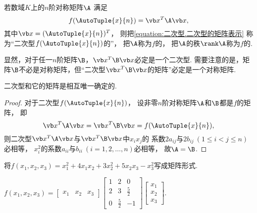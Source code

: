 \begin{definition}
若数域\(K\)上的\(n\)阶对称矩阵\(\A\)
满足\begin{equation}\label{equation:二次型.二次型的矩阵表示}
	f(\AutoTuple{x}{n}) = \x^T\A\x,
\end{equation}
其中\(\x = (\AutoTuple{x}{n})^T\)，
则把\cref{equation:二次型.二次型的矩阵表示}
称为“二次型\(f(\AutoTuple{x}{n})\)的”，
把\(\A\)称为\(f\)的，
把\(\A\)的秩\(\rank\A\)称为\(f\)的.
\end{definition}

显然，对于任一\(n\)阶矩阵\(\B\)，\(\x^T\B\x\)必定是一个二次型.
需要注意的是，矩阵\(\B\)不必是对称矩阵，但“二次型\(\x^T\B\x\)的矩阵”必定是一个对称矩阵.

\begin{property}
二次型和它的矩阵是相互唯一确定的.
\begin{proof}
对于二次型\(f(\AutoTuple{x}{n})\)，
设非零\(n\)阶对称矩阵\(\A\)和\(\B\)都是\(f\)的矩阵，
即\[
	\x^T\A\x
	=\x^T\B\x
	=f(\AutoTuple{x}{n}),
\]
则二次型\(\x^T\A\x\)与\(\x^T\B\x\)中\(x_i x_j\)的
系数\(2 a_{ij}\)与\(2 b_{ij}\ (1 \leq i < j \leq n)\)必相等，
\(x_i^2\)的系数\(a_{ii}\)与\(b_{ii}\ (i=1,2,\dotsc,n)\)必相等，
故\(\A=\B\).
\end{proof}
\end{property}

\begin{example}
将\(f(x_1,x_2,x_3) = x_1^2 + 4 x_1 x_2 + 3 x_2^2 + 5 x_2 x_3 - x_3^2\)写成矩阵形式.
\begin{solution}
\(f(x_1,x_2,x_3)
= \begin{bmatrix}
	x_1 & x_2 & x_3
\end{bmatrix}
\begin{bmatrix}
	1 & 2 & 0 \\
	2 & 3 & \frac{5}{2} \\
	0 & \frac{5}{2} & -1
\end{bmatrix}
\begin{bmatrix}
	x_1 \\ x_2 \\ x_3
\end{bmatrix}\).
\end{solution}
\end{example}

